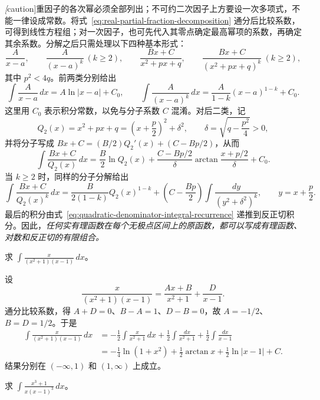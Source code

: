 \emph[caution]{重因子的各次幂必须全部列出；不可约二次因子上方要设一次多项式，不能一律设成常数。}将式~\eqref{eq:real-partial-fraction-decomposition} 通分后比较系数，可得到线性方程组；对一次因子，也可先代入其零点确定最高幂项的系数，再确定其余系数。分解之后只需处理以下四种基本形式：
\[
    \frac{A}{x-a},\qquad \frac{A}{(x-a)^k}\ (k\geq2),\qquad
    \frac{Bx+C}{x^2+px+q},\qquad
    \frac{Bx+C}{(x^2+px+q)^k}\ (k\geq2),
\]
其中 $p^2<4q$。前两类分别给出
\[
    \int\frac{A}{x-a}\,dx=A\ln|x-a|+C_0,
    \qquad
    \int\frac{A}{(x-a)^k}\,dx
       =\frac{A}{1-k}(x-a)^{1-k}+C_0.
\]
这里用 $C_0$ 表示积分常数，以免与分子系数 $C$ 混淆。对后二类，记
\[
    Q_2(x)=x^2+px+q=\left(x+\frac p2\right)^2+\delta^2,
    \qquad \delta=\sqrt{q-\frac{p^2}4}>0,
\]
并将分子写成 $Bx+C=(B/2)Q_2'(x)+(C-Bp/2)$，从而
\begin{equation}
    \int\frac{Bx+C}{Q_2(x)}\,dx
       =\frac B2\ln Q_2(x)
        +\frac{C-Bp/2}{\delta}\arctan\frac{x+p/2}{\delta}+C_0.
    \label{eq:irreducible-quadratic-linear-numerator-integral}
\end{equation}
当 $k\geq2$ 时，同样的分子分解给出
\[
    \int\frac{Bx+C}{Q_2(x)^k}\,dx
      =\frac{B}{2(1-k)}Q_2(x)^{1-k}
        +\left(C-\frac{Bp}2\right)\int\frac{dy}{(y^2+\delta^2)^k},
    \qquad y=x+\frac p2.
\]
最后的积分由式~\eqref{eq:quadratic-denominator-integral-recurrence} 递推到反正切积分。因此，\emph{任何实有理函数在每个无极点区间上的原函数，都可以写成有理函数、对数和反正切的有限组合。}

\begin{example}
\label{ex:partial-fractions-simple-factors}
求 $\displaystyle\int\frac{x}{(x^2+1)(x-1)}\,dx$。
\end{example}

\begin{solve}
设
\[
    \frac{x}{(x^2+1)(x-1)}=\frac{Ax+B}{x^2+1}+\frac D{x-1}.
\]
通分比较系数，得 $A+D=0$、$B-A=1$、$D-B=0$，故 $A=-1/2$、$B=D=1/2$。于是
\begin{align*}
    \int\frac{x}{(x^2+1)(x-1)}\,dx
      &=-\frac12\int\frac{x}{x^2+1}\,dx
          +\frac12\int\frac{dx}{x^2+1}+\frac12\int\frac{dx}{x-1}\\
      &=-\frac14\ln(1+x^2)+\frac12\arctan x
          +\frac12\ln|x-1|+C.
\end{align*}
结果分别在 $(-\infty,1)$ 和 $(1,\infty)$ 上成立。
\end{solve}

\begin{example}
\label{ex:partial-fractions-repeated-factor}
求 $\displaystyle\int\frac{x^3+1}{x(x-1)^3}\,dx$。
\end{example}

